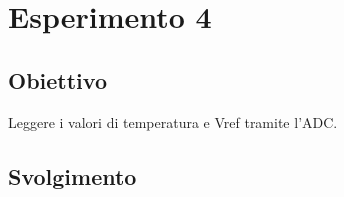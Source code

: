 \chapter*{Esperimento 4}

\section*{Obiettivo}
Leggere i valori di temperatura e Vref tramite l'ADC.

\section*{Svolgimento}